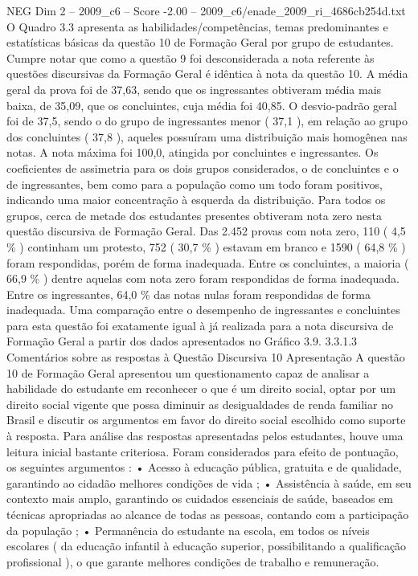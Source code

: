 \begin{textsample}{NEG Dim 2 – 2009\_c6 – Score -2.00 – 2009\_c6/enade\_2009\_ri\_4686cb254d.txt}
O Quadro 3.3 apresenta as habilidades/competências, temas predominantes e estatísticas básicas da questão 10 de Formação Geral por grupo de estudantes.
Cumpre notar que como a questão 9 foi desconsiderada a nota referente às questões discursivas da Formação Geral é idêntica à nota da questão 10.
A média geral da prova foi de 37,63, sendo que os ingressantes obtiveram média mais baixa, de 35,09, que os concluintes, cuja média foi 40,85.
O desvio-padrão geral foi de 37,5, sendo o do grupo de ingressantes menor ( 37,1 ), em relação ao grupo dos concluintes ( 37,8 ), aqueles possuíram uma distribuição mais homogênea nas notas.
A nota máxima foi 100,0, atingida por concluintes e ingressantes.
Os coeficientes de assimetria para os dois grupos considerados, o de concluintes e o de ingressantes, bem como para a população como um todo foram positivos, indicando uma maior concentração à esquerda da distribuição.
Para todos os grupos, cerca de metade dos estudantes presentes obtiveram nota zero nesta questão discursiva de Formação Geral.
Das 2.452 provas com nota zero, 110 ( 4,5 \% ) continham um protesto, 752 ( 30,7 \% ) estavam em branco e 1590 ( 64,8 \% ) foram respondidas, porém de forma inadequada.
Entre os concluintes, a maioria ( 66,9 \% ) dentre aquelas com nota zero foram respondidas de forma inadequada.
Entre os ingressantes, 64,0 \% das notas nulas foram respondidas de forma inadequada.
Uma comparação entre o desempenho de ingressantes e concluintes para esta questão foi exatamente igual à já realizada para a nota discursiva de Formação Geral a partir dos dados apresentados no Gráfico 3.9. 3.3.1.3 Comentários sobre as respostas à Questão Discursiva 10 Apresentação A questão 10 de Formação Geral apresentou um questionamento capaz de analisar a habilidade do estudante em reconhecer o que é um direito social, optar por um direito social vigente que possa diminuir as desigualdades de renda familiar no Brasil e discutir os argumentos em favor do direito social escolhido como suporte à resposta.
Para análise das respostas apresentadas pelos estudantes, houve uma leitura inicial bastante criteriosa.
Foram considerados para efeito de pontuação, os seguintes argumentos : • Acesso à educação pública, gratuita e de qualidade, garantindo ao cidadão melhores condições de vida ; • Assistência à saúde, em seu contexto mais amplo, garantindo os cuidados essenciais de saúde, baseados em técnicas apropriadas ao alcance de todas as pessoas, contando com a participação da população ; • Permanência do estudante na escola, em todos os níveis escolares ( da educação infantil à educação superior, possibilitando a qualificação profissional ), o que garante melhores condições de trabalho e remuneração.

\end{textsample}
